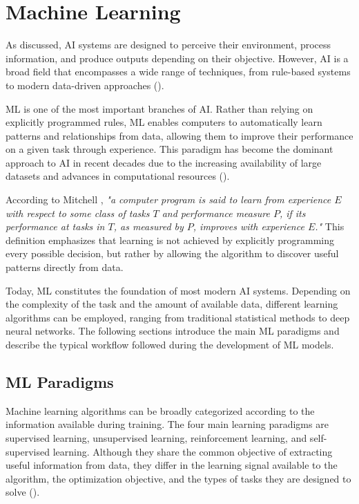 \section{Machine Learning} \label{sec:ml}

As discussed, AI systems are designed to perceive their environment, process information, and produce outputs depending on their objective. However, AI is a broad field that encompasses a wide range of techniques, from 
rule-based systems to modern data-driven approaches (\cite{Russell2016}).

ML is one of the most important branches of AI. Rather than relying on explicitly programmed rules, ML enables computers to automatically learn patterns and relationships from data, allowing them to improve their performance on 
a given task through experience. This paradigm has become the dominant approach to AI in recent decades due to the increasing availability of large datasets and advances in computational resources (\cite{Mitchell2013,Goodfellow2016}).

According to Mitchell \cite{Mitchell2013}, \emph{"a computer program is said to learn from experience $E$ with respect to some class of tasks $T$ and performance measure $P$, if its performance at tasks in $T$, as measured by $P$, 
improves with experience $E$."} This definition emphasizes that learning is not achieved by explicitly programming every possible decision, but rather by allowing the algorithm to discover useful patterns directly from data.

Today, ML constitutes the foundation of most modern AI systems. Depending on the complexity of the task and the amount of available data, different learning algorithms can be employed, ranging from traditional 
statistical methods to deep neural networks. The following sections introduce the main ML paradigms and describe the typical workflow followed during the development of ML models.

\subsection{ML Paradigms} \label{sec:mlpara}

Machine learning algorithms can be broadly categorized according to the information available during training. The four main learning paradigms are supervised learning, unsupervised learning, reinforcement learning, 
and self-supervised learning. Although they share the common objective of extracting useful information from data, they differ in the learning signal available to the algorithm, the optimization objective, and the types of 
tasks they are designed to solve (\cite{Murphy2022}).

